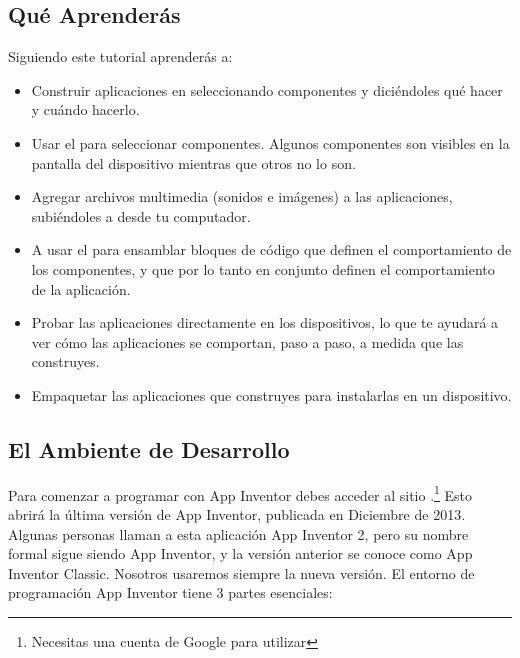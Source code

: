 \documentclass[letterpaper]{article}
\begin{document}
\subsection*{Qué Aprenderás}

Siguiendo este tutorial aprenderás a:

\begin{itemize}

\item Construir aplicaciones en \AppInventor seleccionando componentes
  y diciéndoles qué hacer y cuándo hacerlo.

\item Usar el \componentDesigner para seleccionar componentes. Algunos
  componentes son visibles en la pantalla del dispositivo mientras que
  otros no lo son.

\item Agregar archivos multimedia (sonidos e imágenes) a las
  aplicaciones, subiéndoles a \AppInventor desde tu computador.

\item A usar el \blockEditor para ensamblar bloques de código que
  definen el comportamiento de los componentes, y que por lo tanto en
  conjunto definen el comportamiento de la aplicación.

\item Probar las aplicaciones directamente en los dispositivos, lo que
  te ayudará a ver cómo las aplicaciones se comportan, paso a paso, a
  medida que las construyes.

\item Empaquetar las aplicaciones que construyes para instalarlas en
  un dispositivo.

\end{itemize}

\subsection*{El Ambiente de Desarrollo \AppInventor}

Para comenzar a programar con App Inventor debes acceder al sitio
\aiurl.\footnote{Necesitas una cuenta de Google para utilizar
  \AppInventor} Esto abrirá la última versión de App Inventor,
publicada en Diciembre de 2013. Algunas personas llaman a esta
aplicación App Inventor 2, pero su nombre formal sigue siendo App
Inventor, y la versión anterior se conoce como App Inventor
Classic. Nosotros usaremos siempre la nueva versión.  El entorno de
programación App Inventor tiene 3 partes esenciales:
\end{document}
